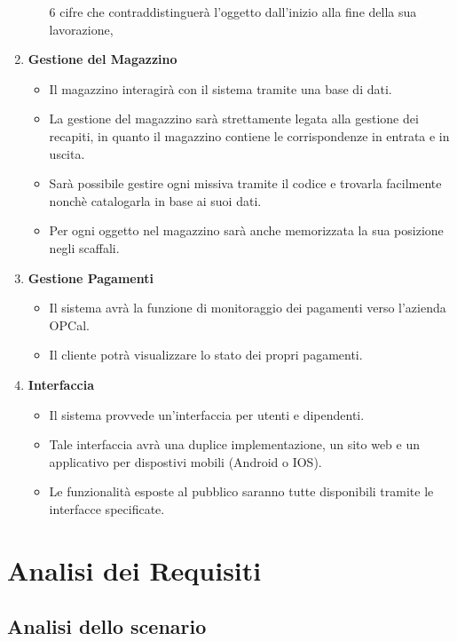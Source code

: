 \documentclass[a4paper,12pt]{article}
\begin{document}
\begin{enumerate}
\begin{itemize}
        6 cifre che contraddistinguerà l'oggetto dall'inizio alla fine della sua lavorazione,
    \end{itemize}
  \item \textbf{Gestione del Magazzino} \begin{itemize}
      \item Il magazzino interagirà con il sistema tramite una base di dati.
      \item La gestione del magazzino sarà strettamente legata alla gestione dei recapiti, in quanto il magazzino contiene 
        le corrispondenze in entrata e in uscita.
      \item Sarà possibile gestire ogni missiva tramite il codice e trovarla facilmente nonchè catalogarla in base ai suoi dati.
      \item Per ogni oggetto nel magazzino sarà anche memorizzata la sua posizione negli scaffali.
    \end{itemize}
  \item \textbf{Gestione Pagamenti} \begin{itemize}
      \item Il sistema avrà la funzione di monitoraggio dei pagamenti verso l'azienda OPCal.
      \item Il cliente potrà visualizzare lo stato dei propri pagamenti.
    \end{itemize}
  \item \textbf{Interfaccia} \begin{itemize}
      \item Il sistema provvede un'interfaccia per utenti e dipendenti.
      \item Tale interfaccia avrà una duplice implementazione, un sito web e un applicativo per dispostivi mobili (Android o IOS).
      \item Le funzionalità esposte al pubblico saranno tutte disponibili tramite le interfacce specificate.
    \end{itemize}
\end{enumerate}

\newpage
\section{Analisi dei Requisiti}
\subsection{Analisi dello scenario}
\end{document}
